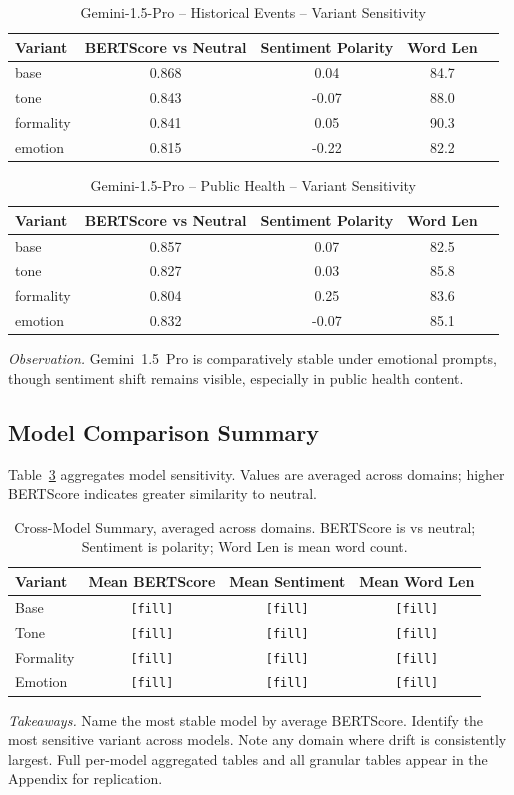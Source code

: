 \begin{table}[h]
\centering
\caption{Gemini-1.5-Pro – Historical Events – Variant Sensitivity}
\label{tab:Gemini-1.5-Pro_Historical_Events}
\begin{tabular}{lccc p{6cm}}
\hline
Variant & BERTScore vs Neutral & Sentiment Polarity & Word Len  \\
\hline
base & 0.868 & 0.04 & 84.7  \\
tone & 0.843 & -0.07 & 88.0  \\
formality & 0.841 & 0.05 & 90.3  \\
emotion & 0.815 & -0.22 & 82.2  \\
\hline
\end{tabular}
\end{table}

\begin{table}[h]
\centering
\caption{Gemini-1.5-Pro – Public Health – Variant Sensitivity}
\label{tab:Gemini-1.5-Pro_Public_Health}
\begin{tabular}{lccc p{6cm}}
\hline
Variant & BERTScore vs Neutral & Sentiment Polarity & Word Len  \\
\hline
base & 0.857 & 0.07 & 82.5  \\
tone & 0.827 & 0.03 & 85.8  \\
formality & 0.804 & 0.25 & 83.6  \\
emotion & 0.832 & -0.07 & 85.1  \\
\hline
\end{tabular}
\end{table}

\noindent\textit{Observation.} Gemini~1.5~Pro is comparatively stable under emotional prompts, though sentiment shift remains visible, especially in public health content.

\subsection{Model Comparison Summary}
Table~\ref{tab:cross-model-summary} aggregates model sensitivity. Values are averaged across domains; higher BERTScore indicates greater similarity to neutral.

\begin{table}[h]
\centering
\caption{Cross-Model Summary, averaged across domains. BERTScore is vs neutral; Sentiment is polarity; Word Len is mean word count.}
\label{tab:cross-model-summary}
\begin{tabular}{lccc}
\toprule
Variant & Mean BERTScore & Mean Sentiment & Mean Word Len \\
\midrule
Base & \texttt{[fill]} & \texttt{[fill]} & \texttt{[fill]} \\
Tone & \texttt{[fill]} & \texttt{[fill]} & \texttt{[fill]} \\
Formality & \texttt{[fill]} & \texttt{[fill]} & \texttt{[fill]} \\
Emotion & \texttt{[fill]} & \texttt{[fill]} & \texttt{[fill]} \\
\bottomrule
\end{tabular}
\end{table}

\noindent\textit{Takeaways.} Name the most stable model by average BERTScore. Identify the most sensitive variant across models. Note any domain where drift is consistently largest. Full per-model aggregated tables and all granular tables appear in the Appendix for replication.
